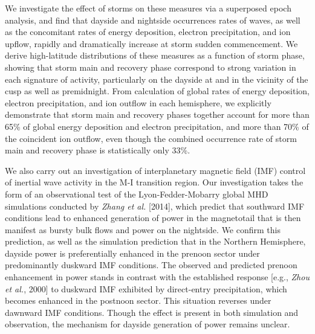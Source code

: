 We investigate the effect of storms on these measures via a superposed
epoch analysis, and find that dayside and nightside occurrences rates
of \Alf waves, as well as the concomitant rates of energy deposition,
electron precipitation, and ion upflow, rapidly and dramatically
increase at storm sudden commencement. We derive high-latitude
distributions of these measures as a function of storm phase, showing
that storm main and recovery phase correspond to strong variation in
each signature of \Alfic activity, particularly on the dayside at and
in the vicinity of the cusp as well as premidnight. From calculation
of global rates of \Alfic energy deposition, electron precipitation,
and ion outflow in each hemisphere, we explicitly demonstrate that
storm main and recovery phases together account for more than 65\% of
global \Alfic energy deposition and electron precipitation, and more
than 70\% of the coincident ion outflow, even though the combined
occurrence rate of storm main and recovery phase is statistically only
33\%.

We also carry out an investigation of interplanetary magnetic field
(IMF) control of inertial \Alf wave activity in the M-I transition
region. Our investigation takes the form of an observational test of
the Lyon-Fedder-Mobarry global MHD simulations conducted by
\textsl{Zhang et al.} [2014], which predict that southward IMF
conditions lead to enhanced generation of power in the magnetotail
that is then manifest as bursty bulk flows and \Alfic power on the
nightside. We confirm this prediction, as well as the simulation
prediction that in the Northern Hemisphere, dayside \Alfic power is
preferentially enhanced in the prenoon sector under predominantly
duskward IMF conditions. The observed and predicted prenoon
enhancement in \Alfic power stands in contrast with the established
response [e.g., \textsl{Zhou et al.}, 2000] to duskward IMF exhibited
by direct-entry precipitation, which becomes enhanced in the postnoon
sector. This situation reverses under dawnward IMF conditions. Though
the effect is present in both simulation and observation, the
mechanism for dayside generation of \Alfic power remains unclear. 

